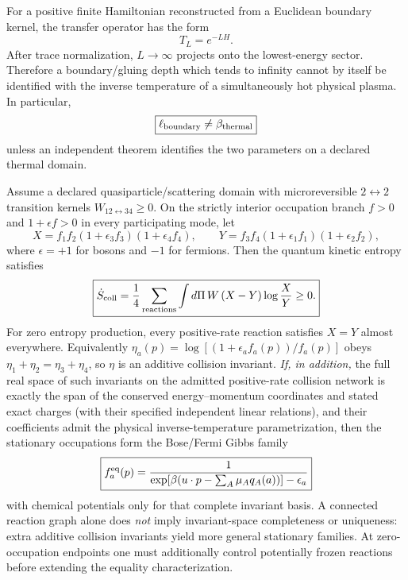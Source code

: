 \documentclass[12pt,a4paper]{article}
\begin{document}
\begin{proposition}
\label{p4:prop:v496-depth-not-beta}
For a positive finite Hamiltonian reconstructed from a Euclidean boundary
kernel, the transfer operator has the form
\[
 T_L=e^{-LH}.
\]
After trace normalization, $L\to\infty$ projects onto the lowest-energy
sector.  Therefore a boundary/gluing depth which tends to infinity cannot by
itself be identified with the inverse temperature of a simultaneously hot
physical plasma.  In particular,
\[
 \boxed{\ell_{\rm boundary}\ne\beta_{\rm thermal}}
\]
unless an independent theorem identifies the two parameters on a declared
thermal domain.
\end{proposition}

\begin{theorem}
\label{p4:thm:v496-quantum-kinetic-h}
Assume a declared quasiparticle/scattering domain with microreversible
$2\leftrightarrow2$ transition kernels
$W_{12\leftrightarrow34}\ge0$.  On the strictly interior occupation branch
$f>0$ and $1+\epsilon f>0$ in every participating mode, let
\[
 X=f_1f_2(1+\epsilon_3f_3)(1+\epsilon_4f_4),\qquad
 Y=f_3f_4(1+\epsilon_1f_1)(1+\epsilon_2f_2),
\]
where $\epsilon=+1$ for bosons and $-1$ for fermions.  Then the quantum
kinetic entropy satisfies
\[
 \boxed{
 \dot S_{\rm coll}
 =\frac14\sum_{\rm reactions}\int d\Pi\,
 W\,(X-Y)\log\frac{X}{Y}\ge0.}
\]
For zero entropy production, every positive-rate reaction satisfies
$X=Y$ almost everywhere.  Equivalently
$\eta_a(p)=\log[(1+\epsilon_af_a(p))/f_a(p)]$ obeys
$\eta_1+\eta_2=\eta_3+\eta_4$, so $\eta$ is an additive collision
invariant.  \emph{If, in addition,} the full real space of such invariants on
the admitted positive-rate collision network is exactly the span of the
conserved energy--momentum coordinates and stated exact charges (with their
specified independent linear relations), and their coefficients admit the
physical inverse-temperature parametrization, then the stationary
occupations form the Bose/Fermi Gibbs family
\[
 \boxed{
 f_a^{\rm eq}(p)=
 \frac{1}{\exp[\beta(u\cdot p-\sum_A\mu_Aq_A(a))]-\epsilon_a}}
\]
with chemical potentials only for that complete invariant basis.  A connected
reaction graph alone does \emph{not} imply invariant-space completeness or
uniqueness: extra additive collision invariants yield more general stationary
families.  At zero-occupation endpoints one must additionally control
potentially frozen reactions before extending the equality characterization.
\end{theorem}
\end{document}

